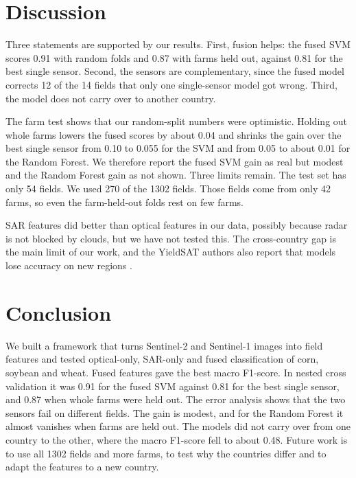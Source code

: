 \documentclass[conference]{IEEEtran}
\begin{document}
\section{Discussion}
Three statements are supported by our results. First, fusion helps: the fused SVM scores 0.91 with random folds and 0.87 with farms held out, against 0.81 for the best single sensor. Second, the sensors are complementary, since the fused model corrects 12 of the 14 fields that only one single-sensor model got wrong. Third, the model does not carry over to another country.

The farm test shows that our random-split numbers were optimistic. Holding out whole farms lowers the fused scores by about 0.04 and shrinks the gain over the best single sensor from 0.10 to 0.055 for the SVM and from 0.05 to about 0.01 for the Random Forest. We therefore report the fused SVM gain as real but modest and the Random Forest gain as not shown. Three limits remain. The test set has only 54 fields. We used 270 of the 1302 fields. Those fields come from only 42 farms, so even the farm-held-out folds rest on few farms.

SAR features did better than optical features in our data, possibly because radar is not blocked by clouds, but we have not tested this. The cross-country gap is the main limit of our work, and the YieldSAT authors also report that models lose accuracy on new regions \cite{yieldsat}.

\section{Conclusion}
We built a framework that turns Sentinel-2 and Sentinel-1 images into field features and tested optical-only, SAR-only and fused classification of corn, soybean and wheat. Fused features gave the best macro F1-score. In nested cross validation it was 0.91 for the fused SVM against 0.81 for the best single sensor, and 0.87 when whole farms were held out. The error analysis shows that the two sensors fail on different fields. The gain is modest, and for the Random Forest it almost vanishes when farms are held out. The models did not carry over from one country to the other, where the macro F1-score fell to about 0.48. Future work is to use all 1302 fields and more farms, to test why the countries differ and to adapt the features to a new country.
\end{document}
